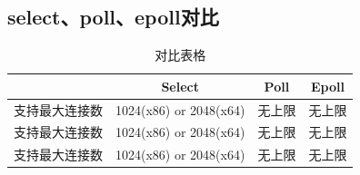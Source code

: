 \subsection{select、poll、epoll对比}
	\begin{table}[htbp]
		\caption{对比表格}
		\centering
		\begin{tabular}{cccc}
			\toprule
			&Select&Poll&Epoll\\
			\midrule
			支持最大连接数&1024(x86) or 2048(x64)&无上限&无上限 \\
			\midrule
			支持最大连接数&1024(x86) or 2048(x64)&无上限&无上限 \\
			\midrule
			支持最大连接数&1024(x86) or 2048(x64)&无上限&无上限 \\
			\bottomrule
		\end{tabular}
	\end{table}
